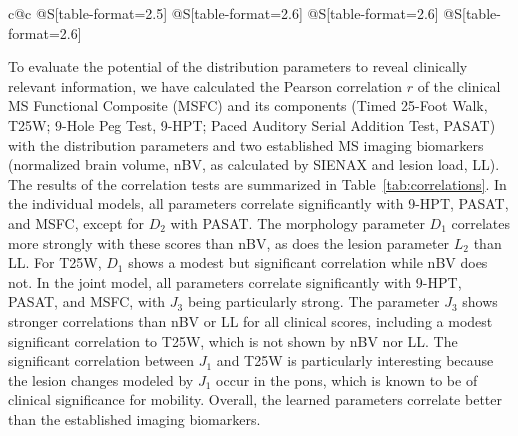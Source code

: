 \begin{table}[tb]
\begin{tabular}{c@{\hspace{\tabspace}}c%
@{\hspace{\tabspace}}S[table-format=2.5]%
@{\hspace{\tabspace}}S[table-format=2.6]
@{\hspace{\tabspace}}S[table-format=2.6]
@{\hspace{\tabspace}}S[table-format=2.6]}
 \bottomrule
\end{tabular}

\end{table}

To evaluate the potential of the distribution parameters to reveal clinically
relevant information, we have calculated the Pearson correlation $r$ of the
clinical MS Functional Composite (MSFC) \cite{Fischer1999} and its components
(Timed 25-Foot Walk, T25W; 9-Hole Peg Test, 9-HPT; Paced Auditory Serial
Addition Test, PASAT) with the distribution parameters and two established MS
imaging biomarkers (normalized brain volume, nBV, as calculated by SIENAX
\cite{Smith2002} and lesion load, LL). The results of the correlation tests are
summarized in Table~\ref{tab:correlations}. In the individual models, all
parameters correlate significantly with 9-HPT, PASAT, and MSFC, except for $D_2$
with PASAT. The morphology parameter $D_1$ correlates more strongly with these
scores than nBV, as does the lesion parameter $L_2$ than LL. For T25W, $D_1$
shows a modest but significant correlation while nBV does not. In the joint
model, all parameters correlate significantly with 9-HPT, PASAT, and MSFC, with
$J_3$ being particularly strong. The parameter $J_3$ shows stronger correlations
than nBV or LL for all clinical scores, including a modest significant
correlation to T25W, which is not shown by nBV nor LL. The significant
correlation between $J_1$ and T25W is particularly interesting because the
lesion changes modeled by $J_1$ occur in the pons, which is known to be of
clinical significance for mobility. Overall, the learned parameters correlate
better than the established imaging biomarkers.

